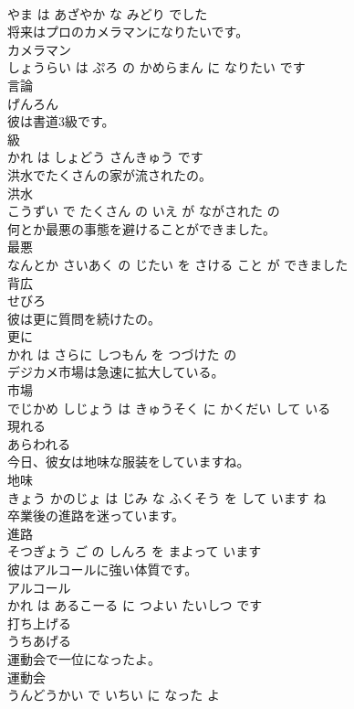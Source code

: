 \documentclass[8pt]{extreport}
\begin{document}
\begin{CJK}{UTF8}{min}
\\	やま は あざやか な みどり でした			
\\	将来はプロのカメラマンになりたいです。	
\\	カメラマン 
\\	しょうらい は ぷろ の かめらまん に なりたい です			
\\	言論	
\\	げんろん			
\\	彼は書道3級です。	
\\	級 
\\	かれ は しょどう さんきゅう です			
\\	洪水でたくさんの家が流されたの。	
\\	洪水 
\\	こうずい で たくさん の いえ が ながされた の			
\\	何とか最悪の事態を避けることができました。	
\\	最悪 
\\	なんとか さいあく の じたい を さける こと が できました			
\\	背広	
\\	せびろ			
\\	彼は更に質問を続けたの。	
\\	更に 
\\	かれ は さらに しつもん を つづけた の			
\\	デジカメ市場は急速に拡大している。	
\\	市場 
\\	でじかめ しじょう は きゅうそく に かくだい して いる			
\\	現れる	
\\	あらわれる			
\\	今日、彼女は地味な服装をしていますね。	
\\	地味 
\\	きょう かのじょ は じみ な ふくそう を して います ね			
\\	卒業後の進路を迷っています。	
\\	進路 
\\	そつぎょう ご の しんろ を まよって います			
\\	彼はアルコールに強い体質です。	
\\	アルコール 
\\	かれ は あるこーる に つよい たいしつ です			
\\	打ち上げる	
\\	うちあげる			
\\	運動会で一位になったよ。	
\\	運動会 
\\	うんどうかい で いちい に なった よ			

\end{CJK}
\end{document}
